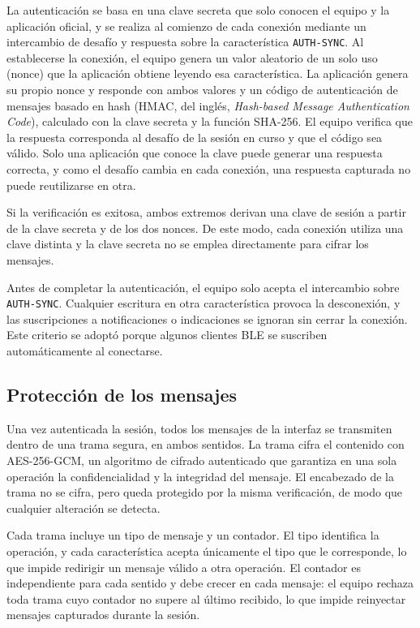 La autenticación se basa en una clave secreta que solo conocen el equipo y la aplicación oficial, y se realiza al comienzo de cada conexión mediante un intercambio de desafío y respuesta sobre la característica \texttt{AUTH-SYNC}. Al establecerse la conexión, el equipo genera un valor aleatorio de un solo uso (nonce) que la aplicación obtiene leyendo esa característica. La aplicación genera su propio nonce y responde con ambos valores y un código de autenticación de mensajes basado en hash (HMAC, del inglés, \textit{Hash-based Message Authentication Code}), calculado con la clave secreta y la función SHA-256. El equipo verifica que la respuesta corresponda al desafío de la sesión en curso y que el código sea válido. Solo una aplicación que conoce la clave puede generar una respuesta correcta, y como el desafío cambia en cada conexión, una respuesta capturada no puede reutilizarse en otra.

Si la verificación es exitosa, ambos extremos derivan una clave de sesión a partir de la clave secreta y de los dos nonces. De este modo, cada conexión utiliza una clave distinta y la clave secreta no se emplea directamente para cifrar los mensajes.

Antes de completar la autenticación, el equipo solo acepta el intercambio sobre \texttt{AUTH-SYNC}. Cualquier escritura en otra característica provoca la desconexión, y las suscripciones a notificaciones o indicaciones se ignoran sin cerrar la conexión. Este criterio se adoptó porque algunos clientes BLE se suscriben automáticamente al conectarse.

\subsection{Protección de los mensajes}
\label{subsec:auth_mensajes}

Una vez autenticada la sesión, todos los mensajes de la interfaz se transmiten dentro de una trama segura, en ambos sentidos. La trama cifra el contenido con AES-256-GCM, un algoritmo de cifrado autenticado que garantiza en una sola operación la confidencialidad y la integridad del mensaje. El encabezado de la trama no se cifra, pero queda protegido por la misma verificación, de modo que cualquier alteración se detecta.

Cada trama incluye un tipo de mensaje y un contador. El tipo identifica la operación, y cada característica acepta únicamente el tipo que le corresponde, lo que impide redirigir un mensaje válido a otra operación. El contador es independiente para cada sentido y debe crecer en cada mensaje: el equipo rechaza toda trama cuyo contador no supere al último recibido, lo que impide reinyectar mensajes capturados durante la sesión.

